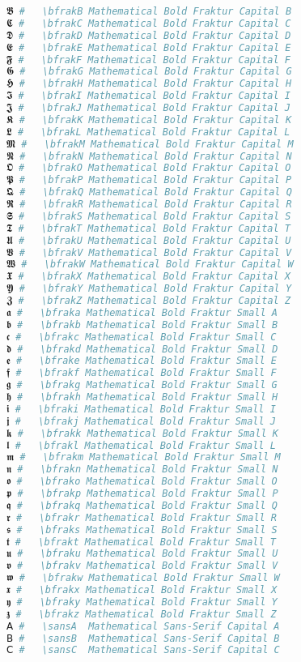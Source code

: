 \begin{lstlisting}[language=Julia]
𝕭 #   \bfrakB Mathematical Bold Fraktur Capital B
𝕮 #   \bfrakC Mathematical Bold Fraktur Capital C
𝕯 #   \bfrakD Mathematical Bold Fraktur Capital D
𝕰 #   \bfrakE Mathematical Bold Fraktur Capital E
𝕱 #   \bfrakF Mathematical Bold Fraktur Capital F
𝕲 #   \bfrakG Mathematical Bold Fraktur Capital G
𝕳 #   \bfrakH Mathematical Bold Fraktur Capital H
𝕴 #   \bfrakI Mathematical Bold Fraktur Capital I
𝕵 #   \bfrakJ Mathematical Bold Fraktur Capital J
𝕶 #   \bfrakK Mathematical Bold Fraktur Capital K
𝕷 #   \bfrakL Mathematical Bold Fraktur Capital L
𝕸 #   \bfrakM Mathematical Bold Fraktur Capital M
𝕹 #   \bfrakN Mathematical Bold Fraktur Capital N
𝕺 #   \bfrakO Mathematical Bold Fraktur Capital O
𝕻 #   \bfrakP Mathematical Bold Fraktur Capital P
𝕼 #   \bfrakQ Mathematical Bold Fraktur Capital Q
𝕽 #   \bfrakR Mathematical Bold Fraktur Capital R
𝕾 #   \bfrakS Mathematical Bold Fraktur Capital S
𝕿 #   \bfrakT Mathematical Bold Fraktur Capital T
𝖀 #   \bfrakU Mathematical Bold Fraktur Capital U
𝖁 #   \bfrakV Mathematical Bold Fraktur Capital V
𝖂 #   \bfrakW Mathematical Bold Fraktur Capital W
𝖃 #   \bfrakX Mathematical Bold Fraktur Capital X
𝖄 #   \bfrakY Mathematical Bold Fraktur Capital Y
𝖅 #   \bfrakZ Mathematical Bold Fraktur Capital Z
𝖆 #   \bfraka Mathematical Bold Fraktur Small A
𝖇 #   \bfrakb Mathematical Bold Fraktur Small B
𝖈 #   \bfrakc Mathematical Bold Fraktur Small C
𝖉 #   \bfrakd Mathematical Bold Fraktur Small D
𝖊 #   \bfrake Mathematical Bold Fraktur Small E
𝖋 #   \bfrakf Mathematical Bold Fraktur Small F
𝖌 #   \bfrakg Mathematical Bold Fraktur Small G
𝖍 #   \bfrakh Mathematical Bold Fraktur Small H
𝖎 #   \bfraki Mathematical Bold Fraktur Small I
𝖏 #   \bfrakj Mathematical Bold Fraktur Small J
𝖐 #   \bfrakk Mathematical Bold Fraktur Small K
𝖑 #   \bfrakl Mathematical Bold Fraktur Small L
𝖒 #   \bfrakm Mathematical Bold Fraktur Small M
𝖓 #   \bfrakn Mathematical Bold Fraktur Small N
𝖔 #   \bfrako Mathematical Bold Fraktur Small O
𝖕 #   \bfrakp Mathematical Bold Fraktur Small P
𝖖 #   \bfrakq Mathematical Bold Fraktur Small Q
𝖗 #   \bfrakr Mathematical Bold Fraktur Small R
𝖘 #   \bfraks Mathematical Bold Fraktur Small S
𝖙 #   \bfrakt Mathematical Bold Fraktur Small T
𝖚 #   \bfraku Mathematical Bold Fraktur Small U
𝖛 #   \bfrakv Mathematical Bold Fraktur Small V
𝖜 #   \bfrakw Mathematical Bold Fraktur Small W
𝖝 #   \bfrakx Mathematical Bold Fraktur Small X
𝖞 #   \bfraky Mathematical Bold Fraktur Small Y
𝖟 #   \bfrakz Mathematical Bold Fraktur Small Z
𝖠 #   \sansA  Mathematical Sans-Serif Capital A
𝖡 #   \sansB  Mathematical Sans-Serif Capital B
𝖢 #   \sansC  Mathematical Sans-Serif Capital C

\end{lstlisting}
